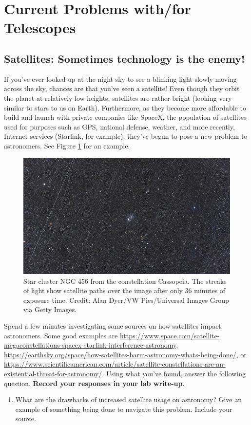 \documentclass[11pt]{article}
\begin{document}
\section{Current Problems with/for Telescopes}
\subsection{Satellites: Sometimes technology is the enemy!}

If you've ever looked up at the night sky to see a blinking light slowly moving across the sky, chances are that you've seen a satellite! Even though they orbit the planet at relatively low heights, satellites are rather bright (looking very similar to stars to us on Earth). Furthermore, as they become more affordable to build and launch with private companies like SpaceX, the population of satellites used for purposes such as GPS, national defense, weather, and more recently, Internet services (Starlink, for example), they've begun to pose a new problem to astronomers. See Figure \ref{fig:satellites} for an example.

\begin{figure}
    \centering
    \includegraphics[width=0.5\linewidth]{Figures/satellites.png}
    \caption{Star cluster NGC 456 from the constellation Cassopeia. The streaks of light show satellite paths over the image after only 36 minutes of exposure time. Credit: Alan Dyer/VW Pics/Universal Images Group via Getty Images.}
    \label{fig:satellites}
\end{figure}

\medskip \noindent
Spend a few minutes investigating some sources on how satellites impact astronomers. Some good examples are \url{https://www.space.com/satellite-megaconstellations-spacex-starlink-interference-astronomy}, \url{https://earthsky.org/space/how-satellites-harm-astronomy-whats-being-done/}, or \url{https://www.scientificamerican.com/article/satellite-constellations-are-an-existential-threat-for-astronomy/}. Using what you've found, answer the following question. \textbf{Record your responses in your lab write-up}.
\begin{enumerate} 
    \item What are the drawbacks of increased satellite usage on astronomy? Give an example of something being done to navigate this problem. Include your source.
\end{enumerate}
\end{document}
